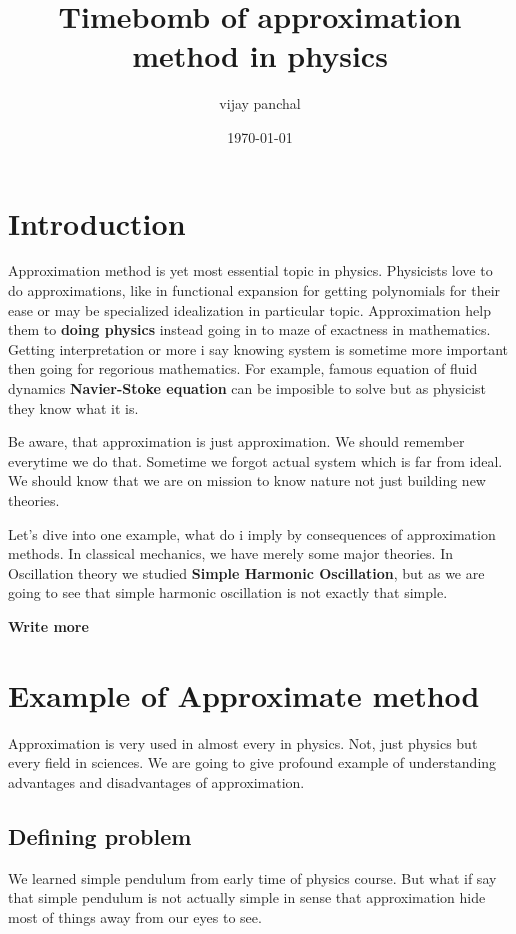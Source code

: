 \documentclass[11pt,a4paper]{article}
\author{vijay panchal}
\date{\today}
\title{Timebomb of approximation method in physics}
\begin{document}
\maketitle
\tableofcontents



\section{Introduction}
\label{sec:org313d79b}

Approximation method is yet most essential topic in physics. Physicists love to do approximations, like in functional expansion for getting polynomials for their ease or may be specialized idealization in particular topic. Approximation help them to \textbf{doing physics} instead going in to maze of exactness in mathematics. Getting interpretation or more i say knowing system is sometime more important then going for regorious mathematics. For example, famous equation of fluid dynamics \textbf{Navier-Stoke equation} can be imposible to solve but as physicist they know what it is.

Be aware, that approximation is just approximation. We should remember everytime we do that. Sometime we forgot actual system which is far from ideal. We should know that we are on mission to know nature not just building new theories.

Let's dive into one example, what do i imply by consequences of approximation methods. In classical mechanics, we have merely some major theories. In Oscillation theory we studied \textbf{Simple Harmonic Oscillation}, but as we are going to see that simple harmonic oscillation is not exactly that simple. 

\textbf{Write more}

\section{Example of Approximate method}
\label{sec:org8c245ec}

Approximation is very used in almost every in physics. Not, just physics but every field in sciences. We are going to give profound example of understanding advantages and disadvantages of approximation.

\subsection{Defining problem}
\label{sec:org8984ee2}

We learned simple pendulum from early time of physics course. But what if say that simple pendulum is not actually simple in sense that approximation hide most of things away from our eyes to see.
\end{document}
